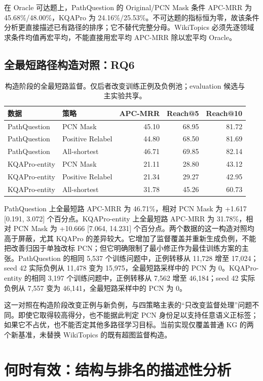 \documentclass[UTF8,a4paper,10pt,fontset=fandol]{ctexart}
\begin{document}
在 Oracle 可达题上，PathQuestion 的 Original/PCN Mask 条件 APC-MRR 为 45.68\%/48.00\%，KQAPro 为 24.16\%/25.53\%。不可达题的指标恒为零，故该条件分析更直接描述已有路径的排序；它不替代完整分母。WikiTopics 必须先逐领域求条件均值再宏平均，不能直接用宏平均 APC-MRR 除以宏平均 Oracle。

\subsection{全最短路径构造对照：RQ6}
\begin{table}[tbp]\centering
\caption{构造阶段的全最短路监督。仅后者改变训练正例及负例池；evaluation 候选与主实验共享。}\label{tab:allshortest}
\small
\begin{tabular}{llrrr}
\toprule
数据 & 策略 & APC-MRR & Reach@5 & Reach@10 \\
\midrule
PathQuestion & PCN Mask & 45.10 & 68.95 & 81.72 \\
PathQuestion & Positive Relabel & 44.80 & 68.50 & 81.69 \\
PathQuestion & All-shortest & 46.71 & 69.85 & 82.14 \\
KQAPro-entity & PCN Mask & 21.11 & 28.80 & 43.12 \\
KQAPro-entity & Positive Relabel & 21.34 & 29.27 & 42.95 \\
KQAPro-entity & All-shortest & 31.78 & 45.26 & 60.73 \\
\bottomrule
\end{tabular}
\end{table}
PathQuestion 上全最短路 APC-MRR 为 46.71\%，相对 PCN Mask 为 +1.617 [0.191, 3.072] 个百分点。KQAPro-entity 上全最短路 APC-MRR 为 31.78\%，相对 PCN Mask 为 +10.666 [7.064, 14.231] 个百分点。两个数据的这一构造对照均高于屏蔽，尤其 KQAPro 的差异较大。它增加了监督覆盖并重新生成负例，不能把改善归因于单独改标 PCN；但它明确限制了最小修正作为最佳训练方案的主张。PathQuestion 的相同 5,537 个训练问题中，正例转移从 11,728 增至 17,024；seed 42 实际负例从 11,478 变为 15,975，全最短路采样中的 PCN 为 0。KQAPro-entity 的相同 3,197 个训练问题中，正例转移从 7,562 增至 46,184；seed 42 实际负例从 7,557 变为 46,141，全最短路采样中的 PCN 为 0。

这一对照在构造阶段改变正例与新负例，与四策略主表的“只改变监督处理”问题不同。即使它取得较高得分，也不能据此判定 PCN 身份足以支持任意语义正标签；如果它不占优，也不能否定其他多路径学习目标。当前实现仅覆盖普通 KG 的两个新基准，未替换 WikiTopics 的既有超图监督构造。

\section{何时有效：结构与排名的描述性分析}
\end{document}
